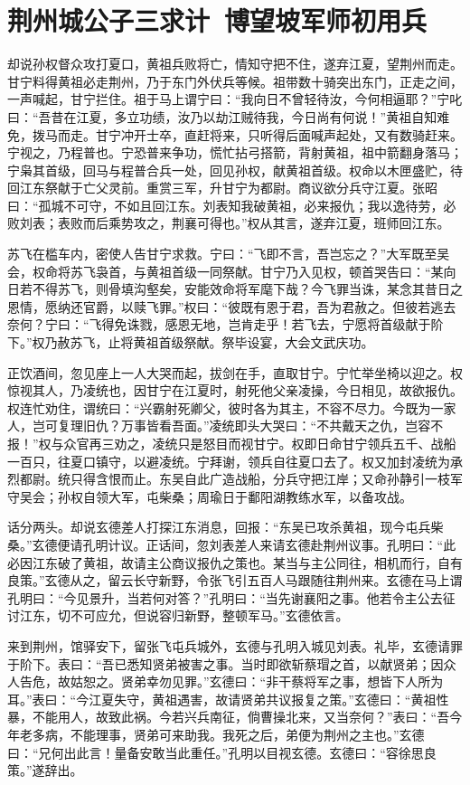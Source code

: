\chapter{荆州城公子三求计~博望坡军师初用兵}

却说孙权督众攻打夏口，黄祖兵败将亡，情知守把不住，遂弃江夏，望荆州而走。甘宁料得黄祖必走荆州，乃于东门外伏兵等候。祖带数十骑突出东门，正走之间，一声喊起，甘宁拦住。祖于马上谓宁曰：“我向日不曾轻待汝，今何相逼耶？”宁叱曰：“吾昔在江夏，多立功绩，汝乃以劫江贼待我，今日尚有何说！”黄祖自知难免，拨马而走。甘宁冲开士卒，直赶将来，只听得后面喊声起处，又有数骑赶来。宁视之，乃程普也。宁恐普来争功，慌忙拈弓搭箭，背射黄祖，祖中箭翻身落马；宁枭其首级，回马与程普合兵一处，回见孙权，献黄祖首级。权命以木匣盛贮，待回江东祭献于亡父灵前。重赏三军，升甘宁为都尉。商议欲分兵守江夏。张昭曰：“孤城不可守，不如且回江东。刘表知我破黄祖，必来报仇；我以逸待劳，必败刘表；表败而后乘势攻之，荆襄可得也。”权从其言，遂弃江夏，班师回江东。

苏飞在槛车内，密使人告甘宁求救。宁曰：“飞即不言，吾岂忘之？”大军既至吴会，权命将苏飞袅首，与黄祖首级一同祭献。甘宁乃入见权，顿首哭告曰：“某向日若不得苏飞，则骨填沟壑矣，安能效命将军麾下哉？今飞罪当诛，某念其昔日之恩情，愿纳还官爵，以赎飞罪。”权曰：“彼既有恩于君，吾为君赦之。但彼若逃去奈何？宁曰：“飞得免诛戮，感恩无地，岂肯走乎！若飞去，宁愿将首级献于阶下。”权乃赦苏飞，止将黄祖首级祭献。祭毕设宴，大会文武庆功。

正饮酒间，忽见座上一人大哭而起，拔剑在手，直取甘宁。宁忙举坐椅以迎之。权惊视其人，乃凌统也，因甘宁在江夏时，射死他父亲凌操，今日相见，故欲报仇。权连忙劝住，谓统曰：“兴霸射死卿父，彼时各为其主，不容不尽力。今既为一家人，岂可复理旧仇？万事皆看吾面。”凌统即头大哭曰：“不共戴天之仇，岂容不报！”权与众官再三劝之，凌统只是怒目而视甘宁。权即日命甘宁领兵五千、战船一百只，往夏口镇守，以避凌统。宁拜谢，领兵自往夏口去了。权又加封凌统为承烈都尉。统只得含恨而止。东吴自此广造战船，分兵守把江岸；又命孙静引一枝军守吴会；孙权自领大军，屯柴桑；周瑜日于鄱阳湖教练水军，以备攻战。

话分两头。却说玄德差人打探江东消息，回报：“东吴已攻杀黄祖，现今屯兵柴桑。”玄德便请孔明计议。正话间，忽刘表差人来请玄德赴荆州议事。孔明曰：“此必因江东破了黄祖，故请主公商议报仇之策也。某当与主公同往，相机而行，自有良策。”玄德从之，留云长守新野，令张飞引五百人马跟随往荆州来。玄德在马上谓孔明曰：“今见景升，当若何对答？”孔明曰：“当先谢襄阳之事。他若令主公去征讨江东，切不可应允，但说容归新野，整顿军马。”玄德依言。

来到荆州，馆驿安下，留张飞屯兵城外，玄德与孔明入城见刘表。礼毕，玄德请罪于阶下。表曰：“吾已悉知贤弟被害之事。当时即欲斩蔡瑁之首，以献贤弟；因众人告危，故姑恕之。贤弟幸勿见罪。”玄德曰：“非干蔡将军之事，想皆下人所为耳。”表曰：“今江夏失守，黄祖遇害，故请贤弟共议报复之策。”玄德曰：“黄祖性暴，不能用人，故致此祸。今若兴兵南征，倘曹操北来，又当奈何？”表曰：“吾今年老多病，不能理事，贤弟可来助我。我死之后，弟便为荆州之主也。”玄德曰：“兄何出此言！量备安敢当此重任。”孔明以目视玄德。玄德曰：“容徐思良策。”遂辞出。

